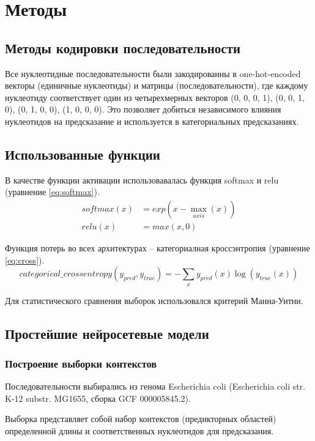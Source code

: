 \section{Методы}
\subsection{Методы кодировки последовательности}
Все нуклеотидные последовательности были закодированны в one-hot-encoded векторы (единичные нуклеотиды) и матрицы (последовательности), где каждому нуклеотиду соответствует один из четырехмерных векторов (0, 0, 0, 1), (0, 0, 1, 0), (0, 1, 0, 0), (1, 0, 0, 0). Это позволяет добиться независимого влияния нуклеотидов на предсказание и используется в категориальных предсказаниях.

\subsection{Использованные функции}

В качестве функции активации использовавалась функция softmax и relu (уравнение \ref{eq:softmax}).
\begin{align} \label{eq:softmax}
softmax(x) &= exp(x - \max_{axis}(x)) \\
relu(x) &= max(x, 0)
\end{align}

Функция потерь во всех архитектурах -- категориалная кроссэнтропия (уравнение \ref{eq:cross}).
\begin{equation} \label{eq:cross}
categorical\_crossentropy(y_{pred}, y_{true}) = -\sum_{x}{y_{pred}(x)\log(y_{true}(x))}
\end{equation}

Для статистического сравнения выборок использовался критерий Манна-Уитни.

\subsection{Простейшие нейросетевые модели}
\subsubsection{Построение выборки контекстов}

Последовательности выбирались из генома  Escherichia coli (Escherichia coli str. K-12 substr. MG1655, сборка GCF 000005845.2).

Выборка представляет собой набор контекстов (предикторных областей) определенной длины и соответственных нуклеотидов для предсказания.

